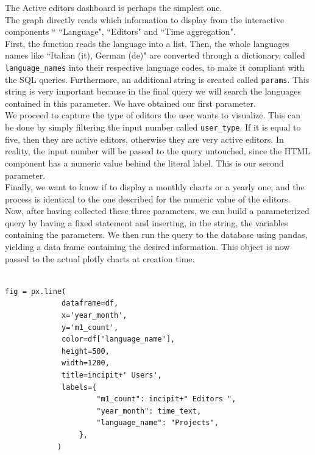 The Active editors dashboard is perhaps the simplest one.\\
The graph directly reads which information to display from the interactive components `` ``Language",  ``Editors" and ``Time aggregation".\\
First, the function reads the language into a list. Then, the whole languages names like ``Italian (it), German (de)" are converted through a dictionary, called \verb#language_names# into their respective language codes, to make it compliant with the SQL queries. Furthermore, an additional string is created called \verb#params#. This string is very important because in the final query we will search the languages contained in this parameter. We have obtained our first parameter.\\
We proceed to capture the type of editors the user wants to visualize. This can be done by simply filtering the input number called \verb#user_type#. If it is equal to five, then they are active editors, otherwise they are very active editors. In reality, the input number will be passed to the query untouched, since the HTML component has a numeric value behind the literal label. This is our second parameter.\\
Finally, we want to know if to display a monthly charts or a yearly one, and the process is identical to the one described for the numeric value of the editors.\\
Now, after having collected these three parameters, we can build a parameterized query by having a fixed statement and inserting, in the string, the variables containing the parameters. We then run the query to the database using pandas, yielding a data frame containing the desired information. This object is now passed to the actual plotly charts at creation time.\\

\lstset{frame=lines}
\lstset{basicstyle=\footnotesize}
\lstset{caption=Creating a line chart}
\begin{lstlisting}

fig = px.line(
             dataframe=df,
             x='year_month',
             y='m1_count',
             color=df['language_name'],
             height=500,
             width=1200,
             title=incipit+' Users',
             labels={
                     "m1_count": incipit+" Editors ",
                     "year_month": time_text,
                     "language_name": "Projects",
                 },
            )
    
\end{lstlisting}

